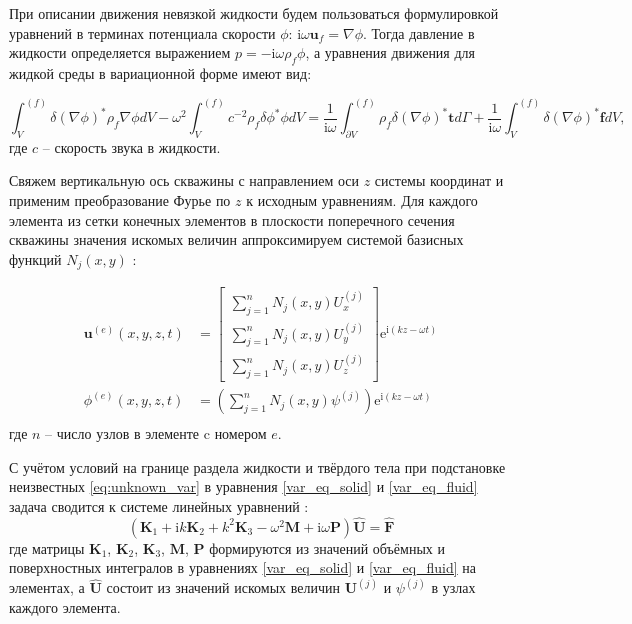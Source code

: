 \documentclass[a4paper,11pt]{article}
\newcommand{\ii}{\mathrm{i}}
\begin{document}
При описании движения невязкой жидкости будем пользоваться формулировкой уравнений в терминах потенциала скорости $\phi$: $\ii \omega \mathbf{u}_f = \nabla \phi$. Тогда давление в жидкости определяется выражением $p = -\ii \omega \rho_f \phi$, а уравнения движения для жидкой среды в вариационной форме имеют вид: 

\begin{equation}
\int_{V}^{(f)} \delta (\nabla\phi)^* \rho_f  \nabla \phi dV - \omega^2 \int_{V}^{(f)}  c^{-2} \rho_f \delta \phi^*  \phi dV = \frac{1}{\ii\omega}\int_{\partial V}^{(f)} \rho_f \delta(\nabla \phi)^* \mathbf{t} d\Gamma + \frac{1}{\ii\omega} \int_{V}^{(f)} \delta(\nabla \phi)^* \mathbf{f} dV, \label{var_eq_fluid}
\end{equation}
где $c$ -- скорость звука в жидкости.

Свяжем вертикальную ось скважины с направлением оси $z$ системы координат и применим преобразование Фурье по $z$ к исходным уравнениям. Для каждого элемента из сетки конечных элементов в плоскости поперечного сечения скважины значения искомых величин аппроксимируем системой базисных функций $N_j(x,y)$ \cite{Zienkiewicz2000}:

\begin{equation}
\begin{split}
\mathbf{u}^{(e)}(x,y,z,t) &= \left[
\begin{array}{c}
\sum_{j=1}^{n}N_j(x,y)U_{x}^{(j)} \\
\sum_{j=1}^{n}N_j(x,y)U_{y}^{(j)} \\
\sum_{j=1}^{n}N_j(x,y)U_{z}^{(j)} 
\end{array}
\right] \mathrm{e}^{\ii (kz-\omega t)} %
\\
\phi^{(e)}(x,y,z,t) &= \left(\sum_{j=1}^{n}N_j(x,y)\psi^{(j)} \right) \mathrm{e}^{\ii (kz-\omega t)} %
\\
\end{split} \label{eq:unknown_var}
\end{equation}
где $n$ -- число узлов в элементе c номером $e$.  

С учётом условий на границе раздела жидкости и твёрдого тела при подстановке неизвестных \eqref{eq:unknown_var} в уравнения \eqref{var_eq_solid} и \eqref{var_eq_fluid} задача сводится к системе линейных уравнений \cite{Bartoli2006,Treyssede2013}:
\begin{equation}
(\mathbf{K}_1 + \ii k \mathbf{K}_2 + k^2 \mathbf{K}_3 - \omega^2 \mathbf{M} + \ii \omega \mathbf{P}) \hat{\mathbf{U}} = \hat{\mathbf{F}} \label{eq:eigen_equation}
\end{equation}
где матрицы $\mathbf{K}_1$, $\mathbf{K}_2$, $\mathbf{K}_3$, $\mathbf{M}$, $\mathbf{P}$ формируются из значений объёмных и поверхностных интегралов в уравнениях \eqref{var_eq_solid} и \eqref{var_eq_fluid} на элементах, а $ \hat{\mathbf{U}}$ состоит из значений искомых величин $\mathbf{U}^{(j)}$ и $\psi^{(j)}$ в узлах каждого элемента. 
\end{document}
